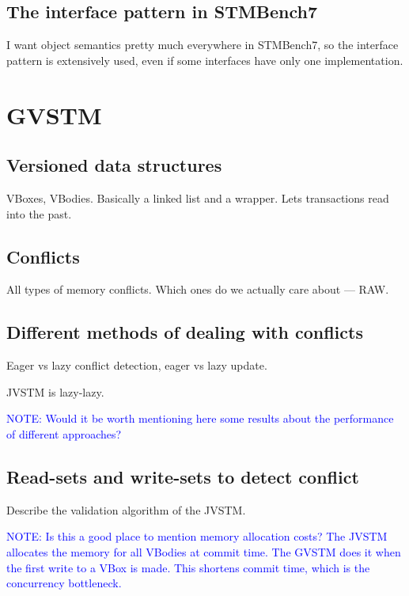 \documentclass[12pt,a4paper,oneside,openright]{report}
\newcommand{\note}[1]{\textcolor{blue}{NOTE: #1}}
\begin{document}
\subsection{The interface pattern in STMBench7}
\label{sec:interf-patt-stmb}

I want object semantics pretty much everywhere in STMBench7, so the
interface pattern is extensively used, even if some interfaces have
only one implementation.

\section{GVSTM}
\label{sec:impl:gvstm}

\subsection{Versioned data structures}
\label{sec:impl:vers-data-struct}

VBoxes, VBodies. Basically a linked list and a wrapper. Lets
transactions read into the past.

\subsection{Conflicts}
\label{sec:impl:conflicts}

All types of memory conflicts. Which ones do we actually care about
--- RAW.

\subsection{Different methods of dealing with conflicts}
\label{sec:impl:diff-meth-deal}

Eager vs lazy conflict detection, eager vs lazy update.

JVSTM is lazy-lazy.

\note{Would it be worth mentioning here some results about the
  performance of different approaches?}

\subsection{Read-sets and write-sets to detect conflict}
\label{sec:impl:read-sets-write}

Describe the validation algorithm of the JVSTM.

\note{Is this a good place to mention memory allocation costs? The
  JVSTM allocates the memory for all VBodies at commit time. The GVSTM
  does it when the first write to a VBox is made. This shortens commit
  time, which is the concurrency bottleneck.}
\end{document}
